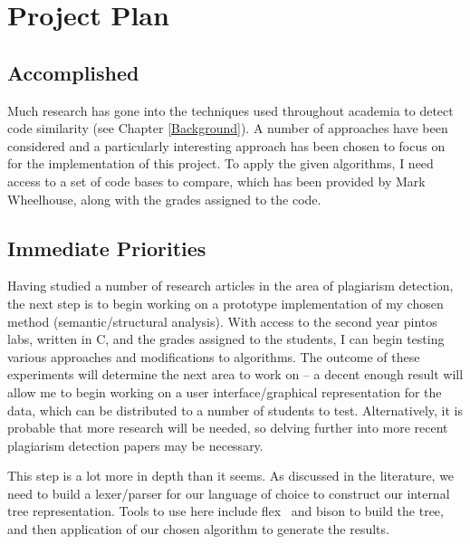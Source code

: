 
\chapter{Project Plan} %

\label{ProjectPlan} %


\section{Accomplished}

Much research has gone into the techniques used throughout academia to detect 
code similarity (see Chapter \ref{Background}). A number of approaches have been considered
and a particularly interesting approach has been chosen to focus on for the 
implementation of this project. To apply the given algorithms, I need access to
a set of code bases to compare, which has been provided by Mark Wheelhouse, along
with the grades assigned to the code.

\section{Immediate Priorities}

Having studied a number of research articles in the area of plagiarism detection,
the next step is to begin working on a prototype implementation of my chosen
method (semantic/structural analysis). With access to the second year pintos labs,
written in C, and the grades assigned to the students, I can begin testing various
approaches and modifications to algorithms. The outcome of these experiments will
determine the next area to work on -- a decent enough result will allow me to
begin working on a user interface/graphical representation for the data, which
can be distributed to a number of students to test. Alternatively, it is probable
that more research will be needed, so delving further into more recent plagiarism
detection papers may be necessary.

This step is a lot more in depth than it seems. As discussed in the literature,
we need to build a lexer/parser for our language of choice to construct our
internal tree representation. Tools to use here include flex~\cite{flex} and bison
\cite{bison} to build the tree, and then application of our chosen algorithm
to generate the results.

